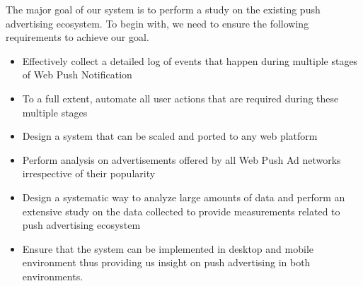 The major goal of our system is to perform a study on the existing push advertising ecosystem. To begin with, we need to ensure the following requirements to achieve our goal.

\begin{itemize}
    \item Effectively collect a detailed log of events that happen during multiple stages of Web Push Notification
    \item To a full extent, automate all user actions that are required during these multiple stages
    \item Design a system that can be scaled and ported to any web platform
    \item Perform analysis on advertisements offered by all Web Push Ad networks irrespective of their popularity
    \item Design a systematic way to analyze large amounts of data and perform an extensive study on the data collected to provide measurements related to push advertising ecosystem 
    \item Ensure that the system can be implemented in desktop and mobile environment thus providing us insight on push advertising in both environments. 
\end{itemize}






